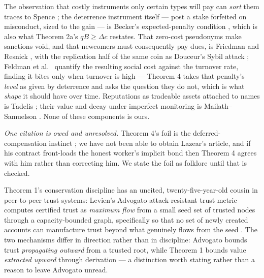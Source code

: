 \documentclass[11pt,a4paper]{article}
\begin{document}
The observation that costly instruments only certain types will pay can \emph{sort} them traces to Spence \cite{spence}; the
deterrence instrument itself --- post a stake forfeited on misconduct, sized to the gain --- is Becker's expected-penalty
condition \cite{becker1968}, which is also what Theorem 2a's $qB\ge\Delta c$ restates. That zero-cost pseudonyms make sanctions
void, and that newcomers must consequently pay dues, is Friedman and Resnick \cite{friedman-resnick}, with the replication half
of the same coin as Douceur's Sybil attack \cite{douceur}; Feldman et al.\ \cite{feldman2004} quantify the resulting social cost
against the turnover rate, finding it bites only when turnover is high --- Theorem 4 takes that penalty's \emph{level} as given
by deterrence and asks the question they do not, which is what \emph{shape} it should have over time. Reputations as tradeable
assets attached to names is Tadelis \cite{tadelis}; their value and decay under imperfect monitoring is Mailath--Samuelson
\cite{mailath-samuelson}. None of these components is ours.

\emph{One citation is owed and unresolved.} Theorem 4's foil is the deferred-compensation instinct \cite{lazear}; we have not
been able to obtain Lazear's article, and if his contract front-loads the honest worker's implicit bond then Theorem 4 agrees
with him rather than correcting him. We state the foil as folklore until that is checked.

Theorem 1's conservation discipline has an uncited, twenty-five-year-old cousin in peer-to-peer trust systems: Levien's
Advogato attack-resistant trust metric computes certified trust as \emph{maximum flow} from a small seed set of trusted nodes
through a capacity-bounded graph, specifically so that no set of newly created accounts can manufacture trust beyond what
genuinely flows from the seed \cite{levien-advogato}. The two mechanisms differ in direction rather than in discipline: Advogato
bounds trust \emph{propagating outward} from a trusted root, while Theorem 1 bounds value \emph{extracted upward} through
derivation --- a distinction worth stating rather than a reason to leave Advogato unread.
\end{document}
